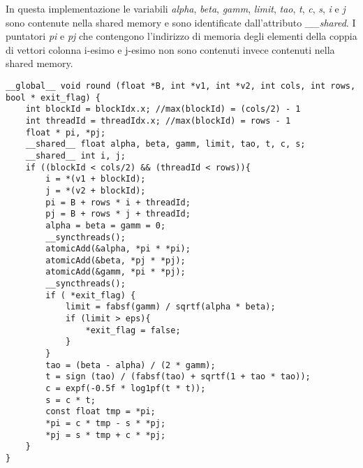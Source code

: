 \label{sec:Semi_Shared}
In questa implementazione le variabili \textit{alpha}, \textit{beta}, \textit{gamm}, \textit{limit}, \textit{tao}, \textit{t}, \textit{c}, \textit{s}, \textit{i} e \textit{j} sono contenute nella shared memory e sono identificate dall'attributo \textit{\_\_shared}. I puntatori \textit{pi} e \textit{pj} che contengono l'indirizzo di memoria degli elementi della coppia di vettori colonna i-esimo e j-esimo non sono contenuti invece contenuti nella shared memory.
\begin{lstlisting}
__global__ void round (float *B, int *v1, int *v2, int cols, int rows, bool * exit_flag) {
	int blockId = blockIdx.x; //max(blockId) = (cols/2) - 1
	int threadId = threadIdx.x; //max(blockId) = rows - 1
	float * pi, *pj;
	__shared__ float alpha, beta, gamm, limit, tao, t, c, s;
	__shared__ int i, j;
	if ((blockId < cols/2) && (threadId < rows)){
		i = *(v1 + blockId);
		j = *(v2 + blockId);
		pi = B + rows * i + threadId;
		pj = B + rows * j + threadId;
		alpha = beta = gamm = 0;
		__syncthreads();
		atomicAdd(&alpha, *pi * *pi);
		atomicAdd(&beta, *pj * *pj);	
		atomicAdd(&gamm, *pi * *pj);
		__syncthreads();
		if ( *exit_flag) {
			limit = fabsf(gamm) / sqrtf(alpha * beta);
			if (limit > eps){
				*exit_flag = false;
			}
		} 
		tao = (beta - alpha) / (2 * gamm);
		t = sign (tao) / (fabsf(tao) + sqrtf(1 + tao * tao)); 
		c = expf(-0.5f * log1pf(t * t));
		s = c * t;
		const float tmp = *pi;
		*pi = c * tmp - s * *pj;
		*pj = s * tmp + c * *pj;
	}
}
\end{lstlisting}